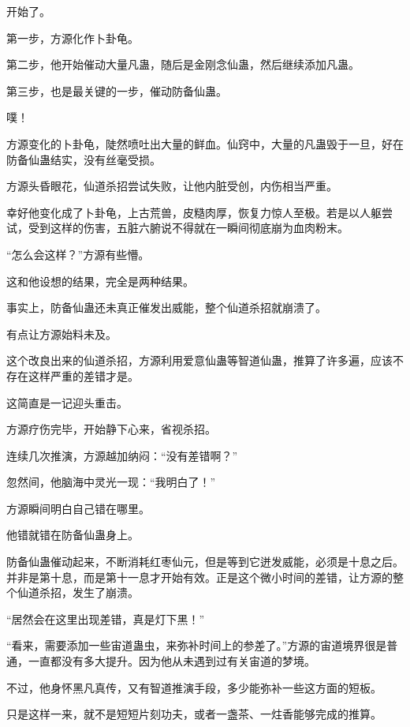 
\begin{this_body}

开始了。

第一步，方源化作卜卦龟。

第二步，他开始催动大量凡蛊，随后是金刚念仙蛊，然后继续添加凡蛊。

第三步，也是最关键的一步，催动防备仙蛊。

噗！

方源变化的卜卦龟，陡然喷吐出大量的鲜血。仙窍中，大量的凡蛊毁于一旦，好在防备仙蛊结实，没有丝毫受损。

方源头昏眼花，仙道杀招尝试失败，让他内脏受创，内伤相当严重。

幸好他变化成了卜卦龟，上古荒兽，皮糙肉厚，恢复力惊人至极。若是以人躯尝试，受到这样的伤害，五脏六腑说不得就在一瞬间彻底崩为血肉粉末。

“怎么会这样？”方源有些懵。

这和他设想的结果，完全是两种结果。

事实上，防备仙蛊还未真正催发出威能，整个仙道杀招就崩溃了。

有点让方源始料未及。

这个改良出来的仙道杀招，方源利用爱意仙蛊等智道仙蛊，推算了许多遍，应该不存在这样严重的差错才是。

这简直是一记迎头重击。

方源疗伤完毕，开始静下心来，省视杀招。

连续几次推演，方源越加纳闷：“没有差错啊？”

忽然间，他脑海中灵光一现：“我明白了！”

方源瞬间明白自己错在哪里。

他错就错在防备仙蛊身上。

防备仙蛊催动起来，不断消耗红枣仙元，但是等到它迸发威能，必须是十息之后。并非是第十息，而是第十一息才开始有效。正是这个微小时间的差错，让方源的整个仙道杀招，发生了崩溃。

“居然会在这里出现差错，真是灯下黑！”

“看来，需要添加一些宙道蛊虫，来弥补时间上的参差了。”方源的宙道境界很是普通，一直都没有多大提升。因为他从未遇到过有关宙道的梦境。

不过，他身怀黑凡真传，又有智道推演手段，多少能弥补一些这方面的短板。

只是这样一来，就不是短短片刻功夫，或者一盏茶、一炷香能够完成的推算。


\end{this_body}
